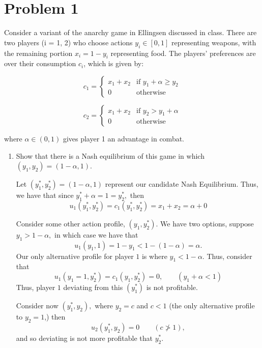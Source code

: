 \documentclass[11pt]{article}
\begin{document}
	
	
	\psetheader
\section*{Problem 1}
\begin{problem}
Consider a variant of the anarchy game in Ellingsen discussed in class. There are two players (i = 1, 2) who choose actions \( y_i \in [0, 1] \) representing weapons, with the remaining portion \( x_i = 1 - y_i \) representing food. The players' preferences are over their consumption \( c_i \), which is given by:



\[ 
c_1 = \begin{cases} 
x_1 + x_2 & \text{if } y_1 + \alpha \geq y_2 \\
0 & \text{otherwise}
\end{cases} 
\]





\[ 
c_2 = \begin{cases} 
x_1 + x_2 & \text{if } y_2 > y_1 + \alpha \\
0 & \text{otherwise}
\end{cases} 
\]



where \( \alpha \in (0, 1) \) gives player 1 an advantage in combat.
\begin{enumerate}
    \item Show that there is a Nash equilibrium of this game in which \( (y_1, y_2) = (1 - \alpha, 1) \).
    \begin{solution}
        Let $(y_1^\ast, y_2^\ast) = (1-\alpha, 1)$ represent our candidate Nash Equilibrium. Thus, we have that since $y_1^*+ \alpha = 1 = y_2^*,$ then
        \[u_1(y_1^\ast, y_2^\ast) = c_1(y_1^\ast, y_2^\ast) = x_1 + x_2 = \alpha + 0\]
        
        Consider some other action profile, $(y_1, y_2^*).$ We have two options, suppose $y_1 > 1-\alpha,$ in which case we have that 
        \[u_1(y_1, 1) = 1- y_1 < 1-(1-\alpha) = \alpha.\]
        Our only alternative profile for player $1$ is where $y_1 < 1 - \alpha.$ Thus, consider that 
        \[u_1(y_1 =1, y_2^*) = c_1(y_1, y_2^*) =  0, \qquad (y_1 + \alpha <1)\] Thus, player $1$ deviating from this $(y_1^*)$ is not profitable. 

        Consider now $(y_1^*, y_2),$ where $y_2 = c$ and $c<1$ (the only alternative profile to $y_2 = 1$,) then 
        \[u_2(y_1^*, y_2) = 0 \qquad (c \not> 1 ),\] and so deviating is not more profitable that $y_2^*.$


\end{solution}
\end{enumerate}
\end{problem}
\end{document}
